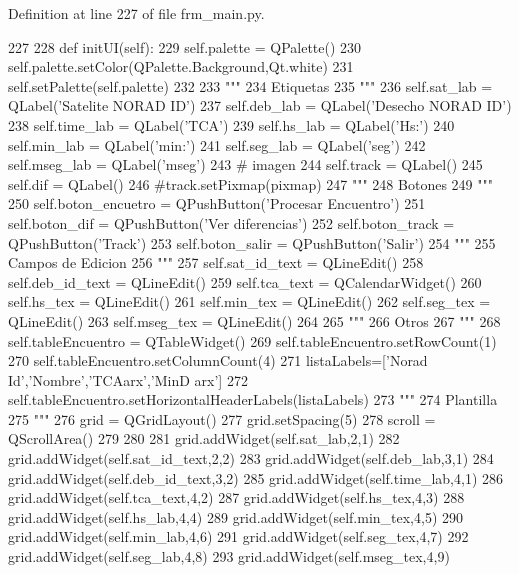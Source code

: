 \-Definition at line 227 of file frm\-\_\-main.\-py.


\begin{DoxyCode}
227 
228     def initUI(self):
229         self.palette = QPalette()
230         self.palette.setColor(QPalette.Background,Qt.white)
231         self.setPalette(self.palette)
232         
233         """
234         Etiquetas
235         """
236         self.sat_lab  = QLabel('Satelite NORAD ID')
237         self.deb_lab  = QLabel('Desecho NORAD ID')
238         self.time_lab = QLabel('TCA')
239         self.hs_lab   = QLabel('Hs:')
240         self.min_lab  = QLabel('min:')
241         self.seg_lab  = QLabel('seg')
242         self.mseg_lab = QLabel('mseg')
243         # imagen 
244         self.track = QLabel() 
245         self.dif   = QLabel()
246         #track.setPixmap(pixmap)
247         """
248         Botones
249         """
250         self.boton_encuetro = QPushButton('Procesar Encuentro')
251         self.boton_dif      = QPushButton('Ver diferencias')
252         self.boton_track    = QPushButton('Track')
253         self.boton_salir    = QPushButton('Salir')
254         """
255         Campos de Edicion
256         """
257         self.sat_id_text = QLineEdit()
258         self.deb_id_text = QLineEdit()
259         self.tca_text    = QCalendarWidget()
260         self.hs_tex      = QLineEdit()
261         self.min_tex     = QLineEdit()
262         self.seg_tex     = QLineEdit()
263         self.mseg_tex    = QLineEdit()
264 
265         """
266         Otros
267         """
268         self.tableEncuentro   = QTableWidget()
269         self.tableEncuentro.setRowCount(1)
270         self.tableEncuentro.setColumnCount(4)
271         listaLabels=['Norad Id','Nombre','TCAarx','MinD arx']
272         self.tableEncuentro.setHorizontalHeaderLabels(listaLabels)
273         """
274         Plantilla
275         """
276         grid = QGridLayout()
277         grid.setSpacing(5)
278         scroll = QScrollArea()
279 
280         
281         grid.addWidget(self.sat_lab,2,1)
282         grid.addWidget(self.sat_id_text,2,2)
283         grid.addWidget(self.deb_lab,3,1)
284         grid.addWidget(self.deb_id_text,3,2)
285         grid.addWidget(self.time_lab,4,1)
286         grid.addWidget(self.tca_text,4,2)
287         grid.addWidget(self.hs_tex,4,3)
288         grid.addWidget(self.hs_lab,4,4)
289         grid.addWidget(self.min_tex,4,5)
290         grid.addWidget(self.min_lab,4,6)
291         grid.addWidget(self.seg_tex,4,7)
292         grid.addWidget(self.seg_lab,4,8)
293         grid.addWidget(self.mseg_tex,4,9)

\end{DoxyCode}
